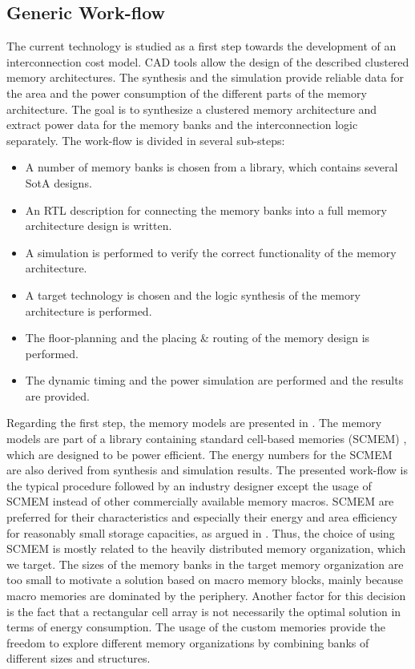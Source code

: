 \subsection{Generic Work-flow}

The current technology is studied as a first step towards the development of an interconnection cost model. 
CAD tools allow the design of the described clustered memory architectures.
The synthesis and the simulation provide reliable data for the area and the power consumption of the different parts of the memory architecture.
The goal is to synthesize a clustered memory architecture and extract power data for the memory banks and the interconnection logic separately.
The work-flow is divided in several sub-steps:

\begin{itemize}
	\item A number of memory banks is chosen from a library, which contains several SotA designs.
	\item An RTL description for connecting the memory banks into a full memory architecture design is written.
	\item A simulation is performed to verify the correct functionality of the memory architecture.
	\item A target technology is chosen and the logic synthesis of the memory architecture is performed.
	\item The floor-planning and the placing \& routing of the memory design is performed.
	\item The dynamic timing and the power simulation are performed and the results are provided.
\end{itemize}

Regarding the first step, the memory models are presented in \cite{filippopoulos2013exploration}.
The memory models are part of a library containing standard cell-based memories (SCMEM) \cite{Mei11}, which are designed to be power efficient. 
The energy numbers for the SCMEM are also derived from synthesis and simulation results.
The presented work-flow is the typical procedure followed by an industry designer except the usage of SCMEM instead of other commercially available memory macros.
SCMEM are preferred for their characteristics and especially their energy and area efficiency for reasonably small storage capacities, as argued in \cite{Mei10}. 
Thus, the choice of using SCMEM is mostly related to the heavily distributed memory organization, which we target. 
The sizes of the memory banks in the target memory organization are too small to motivate a solution based on macro memory blocks, mainly because macro memories are dominated by the periphery.
Another factor for this decision is the fact that a rectangular cell array is not necessarily the optimal solution in terms of energy consumption.
The usage of the custom memories provide the freedom to explore different memory organizations by combining banks of different sizes and structures.  

